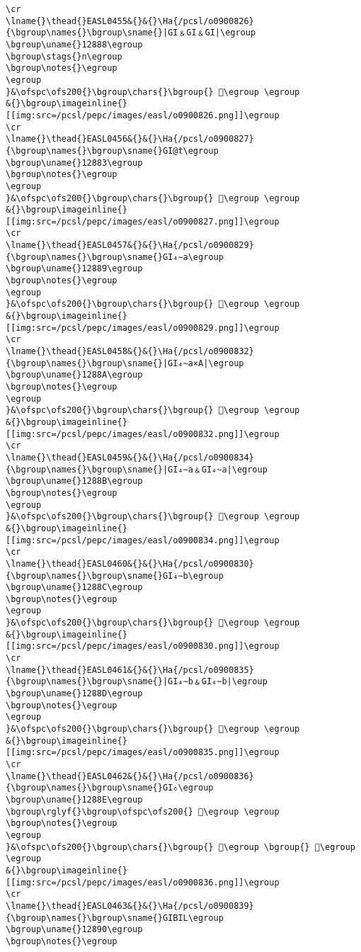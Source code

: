 \begin{verbatim}
\cr
\lname{}\thead{}EASL0455&{}&{}\Ha{/pcsl/o0900826}{\bgroup\names{}\bgroup\sname{}|GI﹠GI﹠GI|\egroup
\bgroup\uname{}12888\egroup
\bgroup\stags{}n\egroup
\bgroup\notes{}\egroup
\egroup
}&\ofspc\ofs200{}\bgroup\chars{}\bgroup{} 𒢈\egroup \egroup
&{}\bgroup\imageinline{}[[img:src=/pcsl/pepc/images/easl/o0900826.png]]\egroup
\cr
\lname{}\thead{}EASL0456&{}&{}\Ha{/pcsl/o0900827}{\bgroup\names{}\bgroup\sname{}GI@t\egroup
\bgroup\uname{}12883\egroup
\bgroup\notes{}\egroup
\egroup
}&\ofspc\ofs200{}\bgroup\chars{}\bgroup{} 𒢃\egroup \egroup
&{}\bgroup\imageinline{}[[img:src=/pcsl/pepc/images/easl/o0900827.png]]\egroup
\cr
\lname{}\thead{}EASL0457&{}&{}\Ha{/pcsl/o0900829}{\bgroup\names{}\bgroup\sname{}GI₄∼a\egroup
\bgroup\uname{}12889\egroup
\bgroup\notes{}\egroup
\egroup
}&\ofspc\ofs200{}\bgroup\chars{}\bgroup{} 𒢉\egroup \egroup
&{}\bgroup\imageinline{}[[img:src=/pcsl/pepc/images/easl/o0900829.png]]\egroup
\cr
\lname{}\thead{}EASL0458&{}&{}\Ha{/pcsl/o0900832}{\bgroup\names{}\bgroup\sname{}|GI₄∼a×A|\egroup
\bgroup\uname{}1288A\egroup
\bgroup\notes{}\egroup
\egroup
}&\ofspc\ofs200{}\bgroup\chars{}\bgroup{} 𒢊\egroup \egroup
&{}\bgroup\imageinline{}[[img:src=/pcsl/pepc/images/easl/o0900832.png]]\egroup
\cr
\lname{}\thead{}EASL0459&{}&{}\Ha{/pcsl/o0900834}{\bgroup\names{}\bgroup\sname{}|GI₄∼a﹠GI₄∼a|\egroup
\bgroup\uname{}1288B\egroup
\bgroup\notes{}\egroup
\egroup
}&\ofspc\ofs200{}\bgroup\chars{}\bgroup{} 𒢋\egroup \egroup
&{}\bgroup\imageinline{}[[img:src=/pcsl/pepc/images/easl/o0900834.png]]\egroup
\cr
\lname{}\thead{}EASL0460&{}&{}\Ha{/pcsl/o0900830}{\bgroup\names{}\bgroup\sname{}GI₄∼b\egroup
\bgroup\uname{}1288C\egroup
\bgroup\notes{}\egroup
\egroup
}&\ofspc\ofs200{}\bgroup\chars{}\bgroup{} 𒢌\egroup \egroup
&{}\bgroup\imageinline{}[[img:src=/pcsl/pepc/images/easl/o0900830.png]]\egroup
\cr
\lname{}\thead{}EASL0461&{}&{}\Ha{/pcsl/o0900835}{\bgroup\names{}\bgroup\sname{}|GI₄∼b﹠GI₄∼b|\egroup
\bgroup\uname{}1288D\egroup
\bgroup\notes{}\egroup
\egroup
}&\ofspc\ofs200{}\bgroup\chars{}\bgroup{} 𒢍\egroup \egroup
&{}\bgroup\imageinline{}[[img:src=/pcsl/pepc/images/easl/o0900835.png]]\egroup
\cr
\lname{}\thead{}EASL0462&{}&{}\Ha{/pcsl/o0900836}{\bgroup\names{}\bgroup\sname{}GI₆\egroup
\bgroup\uname{}1288E\egroup
\bgroup\rglyf{}\bgroup\ofspc\ofs200{} 𒢎\egroup \egroup
\bgroup\notes{}\egroup
\egroup
}&\ofspc\ofs200{}\bgroup\chars{}\bgroup{} 𒢏\egroup \bgroup{} 𒢎\egroup \egroup
&{}\bgroup\imageinline{}[[img:src=/pcsl/pepc/images/easl/o0900836.png]]\egroup
\cr
\lname{}\thead{}EASL0463&{}&{}\Ha{/pcsl/o0900839}{\bgroup\names{}\bgroup\sname{}GIBIL\egroup
\bgroup\uname{}12890\egroup
\bgroup\notes{}\egroup

\end{verbatim}
